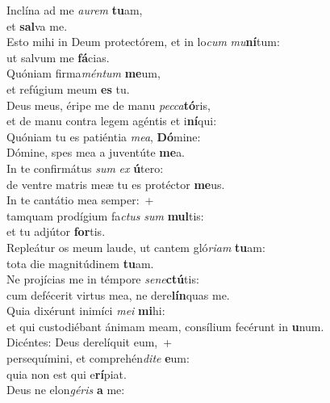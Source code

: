 \evenverse Inclína ad me \textit{au}\textit{rem} \textbf{tu}am,~\*\\
\evenverse et \textbf{sal}va me.\\
\oddverse Esto mihi in Deum protectórem, et in lo\textit{cum} \textit{mu}\textbf{ní}tum:~\*\\
\oddverse ut salvum me \textbf{fá}cias.\\
\evenverse Quóniam firma\textit{mén}\textit{tum} \textbf{me}um,~\*\\
\evenverse et refúgium meum \textbf{es} tu.\\
\oddverse Deus meus, éripe me de manu \textit{pec}\textit{ca}\textbf{tó}ris,~\*\\
\oddverse et de manu contra legem agéntis et i\textbf{ní}qui:\\
\evenverse Quóniam tu es patiéntia \textit{me}\textit{a}, \textbf{Dó}mine:~\*\\
\evenverse Dómine, spes mea a juventúte \textbf{me}a.\\
\oddverse In te confirmátus \textit{sum} \textit{ex} \textbf{ú}tero:~\*\\
\oddverse de ventre matris meæ tu es protéctor \textbf{me}us.\\
\evenverse In te cantátio mea semper:~+\\
\evenverse  tamquam prodígium fa\textit{ctus} \textit{sum} \textbf{mul}tis:~\*\\
\evenverse et tu adjútor \textbf{for}tis.\\
\oddverse Repleátur os meum laude, ut cantem gló\textit{ri}\textit{am} \textbf{tu}am:~\*\\
\oddverse tota die magnitúdinem \textbf{tu}am.\\
\evenverse Ne projícias me in témpore \textit{se}\textit{ne}\textbf{ctú}tis:~\*\\
\evenverse cum defécerit virtus mea, ne dere\textbf{lín}quas me.\\
\oddverse Quia dixérunt inimíci \textit{me}\textit{i} \textbf{mi}hi:~\*\\
\oddverse et qui custodiébant ánimam meam, consílium fecérunt in \textbf{u}num.\\
\evenverse Dicéntes: Deus derelíquit eum,~+\\
\evenverse  persequímini, et comprehén\textit{di}\textit{te} \textbf{e}um:~\*\\
\evenverse quia non est qui e\textbf{rí}piat.\\
\oddverse Deus ne elon\textit{gé}\textit{ris} \textbf{a} me:~\*\\
